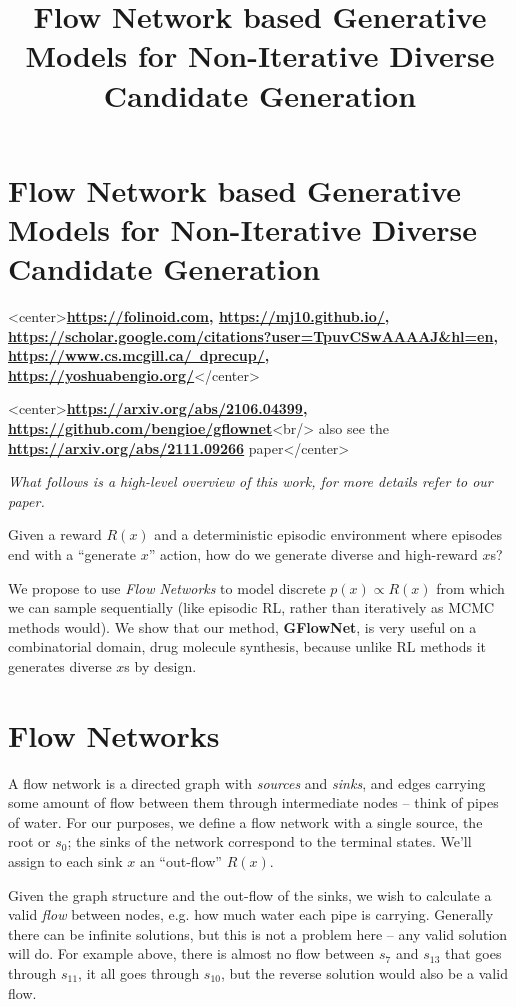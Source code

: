
\title{Flow Network based Generative Models for Non-Iterative Diverse Candidate Generation}
\section{Flow Network based Generative Models for Non-Iterative Diverse Candidate Generation}
<center>\textbf{\href{Emmanuel Bengio}{https://folinoid.com}, \href{Moksh Jain}{https://mj10.github.io/}, \href{Maksym Korablyov}{https://scholar.google.com/citations?user=TpuvCSwAAAAJ&hl=en}, \href{Doina Precup}{https://www.cs.mcgill.ca/~dprecup/}, \href{Yoshua Bengio}{https://yoshuabengio.org/}}</center>


<center>\textbf{\href{arXiv preprint}{https://arxiv.org/abs/2106.04399}, \href{code}{https://github.com/bengioe/gflownet}}<br/> also see the \textbf{\href{GFlowNet Foundations}{https://arxiv.org/abs/2111.09266}} paper</center>

\emph{What follows is a high-level overview of this work, for more details refer to our paper.}

Given a reward $R(x)$ and a deterministic episodic environment where episodes end with a ``generate $x$'' action, how do we generate diverse and high-reward $x$s?

We propose to use \emph{Flow Networks} to model discrete $p(x) \propto R(x)$ from which we can sample sequentially (like episodic RL, rather than iteratively as MCMC methods would). We show that our method, \textbf{GFlowNet}, is very useful on a combinatorial domain, drug molecule synthesis, because unlike RL methods it generates diverse $x$s by design.

\section{Flow Networks}

A flow network is a directed graph with \emph{sources} and \emph{sinks}, and edges carrying some amount of flow between them through intermediate nodes -- think of pipes of water. For our purposes, we define a flow network with a single source, the root or $s_0$; the sinks of the network correspond to the terminal states. We'll assign to each sink $x$ an ``out-flow'' $R(x)$. 



Given the graph structure and the out-flow of the sinks, we wish to calculate a valid \emph{flow} between nodes, e.g. how much water each pipe is carrying. Generally there can be infinite solutions, but this is not a problem here -- any valid solution will do. For example above, there is almost no flow between $s_7$ and $s_{13}$ that goes through $s_{11}$, it all goes through $s_{10}$, but the reverse solution would also be a valid flow.

